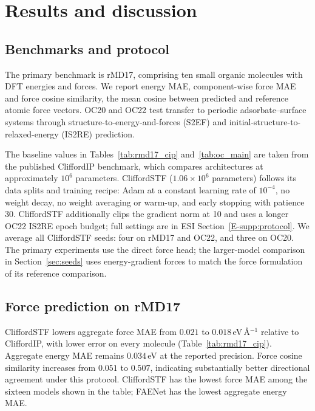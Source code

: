 \section{Results and discussion}\label{sec:experiments}

\subsection{Benchmarks and protocol}\label{sec:benchmarks}

The primary benchmark is rMD17, comprising ten small organic molecules with DFT energies and forces. We report energy MAE, component-wise force MAE and force cosine similarity, the mean cosine between predicted and reference atomic force vectors. OC20 and OC22 test transfer to periodic adsorbate--surface systems through structure-to-energy-and-forces (S2EF) and initial-structure-to-relaxed-energy (IS2RE) prediction.

The baseline values in Tables~\ref{tab:rmd17_cip} and~\ref{tab:oc_main} are taken from the published CliffordIP benchmark, which compares architectures at approximately $10^6$ parameters. CliffordSTF ($1.06\times10^6$ parameters) follows its data splits and training recipe: Adam \cite{kingma2015adam} at a constant learning rate of $10^{-4}$, no weight decay, no weight averaging or warm-up, and early stopping with patience 30. CliffordSTF additionally clips the gradient norm at 10 and uses a longer OC22 IS2RE epoch budget; full settings are in ESI Section~\ref{E-supp:protocol}. We average all CliffordSTF seeds: four on rMD17 and OC22, and three on OC20. The primary experiments use the direct force head; the larger-model comparison in Section~\ref{sec:seeds} uses energy-gradient forces to match the force formulation of its reference comparison.

\subsection{Force prediction on rMD17}\label{sec:cliffordip}

CliffordSTF lowers aggregate force MAE from $0.021$ to $0.018$\,eV\,\AA$^{-1}$ relative to CliffordIP, with lower error on every molecule (Table~\ref{tab:rmd17_cip}). Aggregate energy MAE remains $0.034$\,eV at the reported precision. Force cosine similarity increases from $0.051$ to $0.507$, indicating substantially better directional agreement under this protocol. CliffordSTF has the lowest force MAE among the sixteen models shown in the table; FAENet has the lowest aggregate energy MAE.


